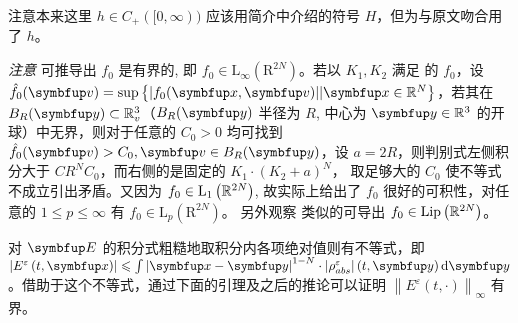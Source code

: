 注意本来这里 $h\in C_+([0,\infty))$ 应该用简介中介绍的符号 $H$，但为与原文吻合用了 $h$。

\textit{注意 } \supremumf 可推导出 $f_0$ 是有界的, 即 $f_0 \in \mathrm{L}_{\infty}\left(\mathrm{R}^{2 N}\right)$。若以 $K_1, K_2$ 满足 \supremumf 的 $f_0$，设 $\hat{f}_0 (\vv)=\sup \left\{|f_0(\vx,\vect{v})| |\vx \in \bbR^{N}\right\}$，若其在 $B_R(\vy)\subset \bbR_{v}^3 $（$B_R(\vy)$ 半径为 $R$, 中心为 $\vy\in \bbR^3$ 的开球）中无界，则对于任意的 $C_0>0$ 均可找到 $\hat{f}_0(\vv)>C_0, \vv \in B_R(\vy)$，设 $a=2R$，则\supremumf 判别式左侧积分大于 $CR^N C_0$，而右侧的是固定的 $K_{1} \cdot\left(K_{2}+a\right)^{N}$， 取足够大的 $C_0$ 使不等式不成立引出矛盾。又因为 $f_0 \in \mathrm{L}_{1}\left({\mathbb{R}}^{2 N}\right)$, 故\supremumf 实际上给出了 $f_0$ 很好的可积性，对任意的 $1 \leqslant p \leqslant \infty$ 有 $f_0 \in \mathrm{L}_{p}\left(\mathrm{R}^{2 N}\right)$。
另外观察 \lipOffVsphere 类似的可导出 $f_{0} \in \operatorname{Lip}\left({\mathbb{R}}^{2 N}\right)$。


对 $\vE$ 的积分式粗糙地取积分内各项绝对值则有不等式，即 $\left|E^{\varepsilon}\left(t, \vx \right)\right| \leqslant \int\left|\vx-\vy\right|^{1-N} \cdot\left|\rho^{\varepsilon}_{abs}\right|\left(t, \vy\right) \mathrm{d} \vy$。借助于这个不等式，通过下面的引理及之后的推论可以证明 $\left\|E^{\varepsilon}(t, \cdot)\right\|_{\infty}$ 有界。

